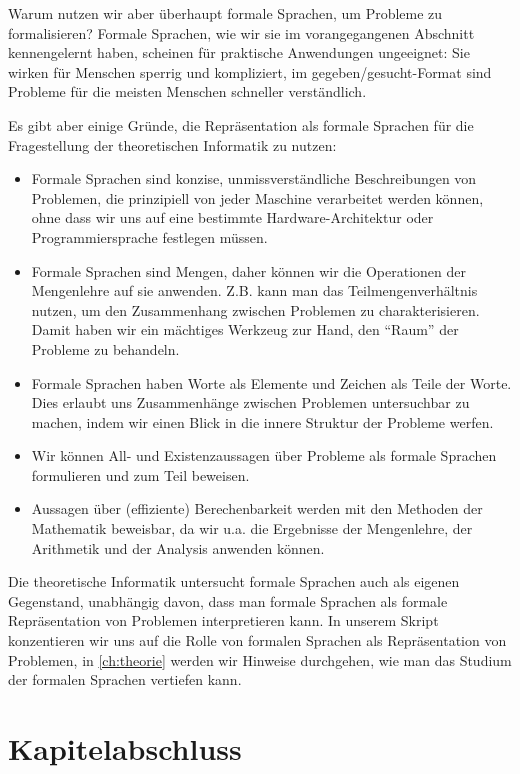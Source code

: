 Warum nutzen wir aber überhaupt formale Sprachen,
um Probleme zu formalisieren?
Formale Sprachen,
wie wir sie im vorangegangenen Abschnitt kennengelernt haben,
scheinen für praktische Anwendungen ungeeignet:
Sie wirken für Menschen sperrig und kompliziert,
im gegeben/gesucht-Format sind Probleme für die meisten Menschen schneller verständlich.

Es gibt aber einige Gründe,
die Repräsentation als formale Sprachen
für die Fragestellung der theoretischen Informatik zu nutzen:
\begin{itemize}
    \item Formale Sprachen sind konzise, unmissverständliche Beschreibungen von Problemen,
        die prinzipiell von jeder Maschine verarbeitet werden können,
        ohne dass wir uns auf eine bestimmte Hardware-Architektur oder Programmiersprache
        festlegen müssen.
    \item Formale Sprachen sind Mengen, daher können wir die Operationen der Mengenlehre
        auf sie anwenden.
        Z.B. kann man das Teilmengenverhältnis nutzen,
        um den Zusammenhang zwischen Problemen zu charakterisieren.
        Damit haben wir ein mächtiges Werkzeug zur Hand,
        den ``Raum'' der Probleme zu behandeln.
    \item Formale Sprachen haben Worte als Elemente und Zeichen als Teile der Worte.
        Dies erlaubt uns Zusammenhänge zwischen Problemen untersuchbar zu machen,
        indem wir einen Blick in die innere Struktur der Probleme werfen.
    \item Wir können All- und Existenzaussagen über Probleme als formale Sprachen formulieren
        und zum Teil beweisen.
    \item Aussagen über (effiziente) Berechenbarkeit werden mit den Methoden der Mathematik
        beweisbar, da wir u.a. die Ergebnisse der Mengenlehre, der Arithmetik
        und der Analysis anwenden können.
\end{itemize}

Die theoretische Informatik untersucht formale Sprachen auch als eigenen Gegenstand,
unabhängig davon, dass man formale Sprachen als formale Repräsentation von Problemen
interpretieren kann.
In unserem Skript konzentieren wir uns auf die Rolle von formalen Sprachen als
Repräsentation von Problemen,
in \autoref{ch:theorie} werden wir Hinweise durchgehen,
wie man das Studium der formalen Sprachen vertiefen kann.

\section{Kapitelabschluss}
